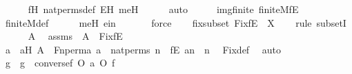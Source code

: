 \begin{isabellebody}
\ \ \ \ \isamarkupfalse%
\ fH\ nat{\isacharunderscore}{\kern0pt}perms{\isacharunderscore}{\kern0pt}def\ EH\ meH\isanewline
\ \ \ \ \isamarkupfalse%
\ auto\isanewline
\isanewline
\ \ \isamarkupfalse%
\ \isamarkupfalse%
\ imgfinite{\isacharcolon}{\kern0pt}\ {\isachardoublequoteopen}finite{\isacharunderscore}{\kern0pt}M{\isacharparenleft}{\kern0pt}f{\isacharbackquote}{\kern0pt}{\isacharbackquote}{\kern0pt}E{\isacharparenright}{\kern0pt}{\isachardoublequoteclose}\ \isanewline
\ \ \ \ \isamarkupfalse%
\ finite{\isacharunderscore}{\kern0pt}M{\isacharunderscore}{\kern0pt}def\isanewline
\ \ \ \ \isamarkupfalse%
\ meH\ e{\isacharprime}{\kern0pt}in\ \isanewline
\ \ \ \ \isamarkupfalse%
\ force\isanewline
\isanewline
\ \ \isamarkupfalse%
\ fixsubset{\isacharcolon}{\kern0pt}\ {\isachardoublequoteopen}Fix{\isacharparenleft}{\kern0pt}f{\isacharbackquote}{\kern0pt}{\isacharbackquote}{\kern0pt}E{\isacharparenright}{\kern0pt}\ {\isasymsubseteq}\ X{\isachardoublequoteclose}\ \isanewline
\ \ \isamarkupfalse%
{\isacharparenleft}{\kern0pt}rule\ subsetI{\isacharparenright}{\kern0pt}\isanewline
\ \ \ \ \isamarkupfalse%
\ A\ \isamarkupfalse%
\ assms{}\ {\isacharcolon}{\kern0pt}\ {\isachardoublequoteopen}A\ {\isasymin}\ Fix{\isacharparenleft}{\kern0pt}f{\isacharbackquote}{\kern0pt}{\isacharbackquote}{\kern0pt}E{\isacharparenright}{\kern0pt}{\isachardoublequoteclose}\ \isanewline
\ \ \ \ \isamarkupfalse%
\ \isamarkupfalse%
\ a\ \ aH{\isacharcolon}{\kern0pt}\ {\isachardoublequoteopen}A\ {\isacharequal}{\kern0pt}\ Fn{\isacharunderscore}{\kern0pt}perm{\isacharprime}{\kern0pt}{\isacharparenleft}{\kern0pt}a{\isacharparenright}{\kern0pt}{\isachardoublequoteclose}\ {\isachardoublequoteopen}a\ {\isasymin}\ nat{\isacharunderscore}{\kern0pt}perms{\isachardoublequoteclose}\ {\isachardoublequoteopen}{\isasymforall}n\ {\isasymin}\ f{\isacharbackquote}{\kern0pt}{\isacharbackquote}{\kern0pt}E{\isachardot}{\kern0pt}\ a{\isacharbackquote}{\kern0pt}n\ {\isacharequal}{\kern0pt}\ n{\isachardoublequoteclose}\ \isamarkupfalse%
\ Fix{\isacharunderscore}{\kern0pt}def\ \isamarkupfalse%
\ auto\isanewline
\ \ \isanewline
\ \ \ \ \isamarkupfalse%
\ g\ \ {\isachardoublequoteopen}g\ {\isasymequiv}\ converse{\isacharparenleft}{\kern0pt}f{\isacharparenright}{\kern0pt}\ O\ a\ O\ f{\isachardoublequoteclose}\ \isanewline

\end{isabellebody}
